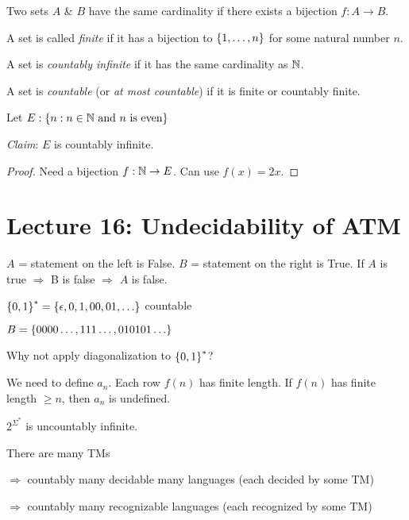 \begin{definition}
    Two sets $A$ \& $B$ have the same cardinality if there exists a bijection $f: A \rightarrow B$.
\end{definition}

\begin{definition}
    A set is called \emph{finite} if it has a bijection to $\left \{ 1, \ldots, n \right \}$ for some natural number $n$.
\end{definition}

\begin{definition}
    A set is \emph{countably infinite} if it has the same cardinality as $\mathbb{N}$.
\end{definition}

\begin{definition}
    A set is \emph{countable} (or \emph{at most countable}) if it is finite or countably finite.
\end{definition}

Let $E: \left \{ n: n \in \mathbb{N} \text{ and } n \text{ is even} \right \}$

\emph{Claim}: $E$ is countably infinite.

\begin{proof}
    Need a bijection $f: \mathbb{N} \rightarrow E$. Can use $f(x) = 2x$.
\end{proof}

\section*{Lecture 16: Undecidability of ATM}

$A$ =  statement on the left is False. $B$ = statement on the right is True. If $A$ is true $\Rightarrow$ B is false $\Rightarrow$ $A$ is false.

$\left \{ 0, 1 \right \}^* = \left \{ \epsilon, 0, 1, 00, 01, \ldots \right \}$ countable

$B = \left \{ 0000\ldots, 111\ldots, 010101\ldots \right \}$

Why not apply diagonalization to $\left \{ 0, 1 \right \}^*$?

We need to define $a_n$. Each row $f(n)$ has finite length. If $f(n)$ has finite length $\geq n$, then $a_n$ is undefined.

$2^{\Sigma^*}$ is uncountably infinite.

There are many TMs

\begin{description}
    \item $\Rightarrow$ countably many decidable many languages (each decided by some TM)
    \item $\Rightarrow$ countably many recognizable languages (each recognized by some TM)
\end{description}
